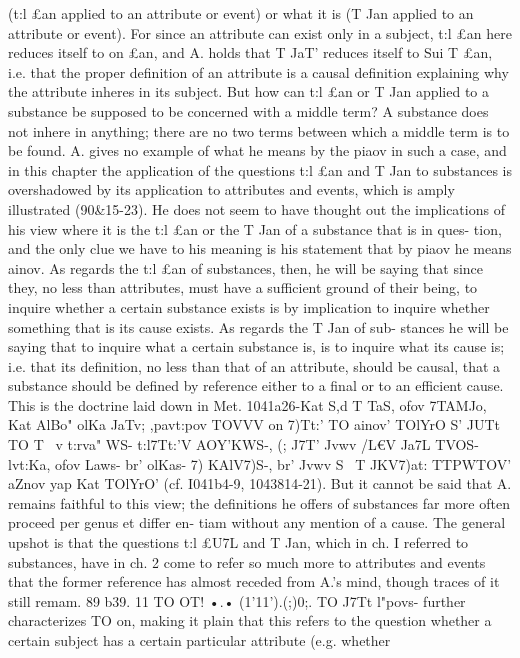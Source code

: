 (t:l £an applied to an attribute or event) or what it is (T{ Jan
applied to an attribute or event). For since an attribute can
exist only in a subject, t:l £an here reduces itself to on £an,
and A. holds that T{ JaT' reduces itself to Sui T{ £an, i.e. that the
proper definition of an attribute is a causal definition explaining
why the attribute inheres in its subject. But how can t:l £an or
T{ Jan applied to a substance be supposed to be concerned with
a middle term? A substance does not inhere in anything; there
are no two terms between which a middle term is to be found.
A. gives no example of what he means by the piaov in such a
case, and in this chapter the application of the questions t:l £an
and T{ Jan to substances is overshadowed by its application to
attributes and events, which is amply illustrated (90&15-23). He
does not seem to have thought out the implications of his view
where it is the t:l £an or the T{ Jan of a substance that is in ques-
tion, and the only clue we have to his meaning is his statement
that by piaov he means ainov. As regards the t:l £an of substances,
then, he will be saying that since they, no less than attributes,
must have a sufficient ground of their being, to inquire whether
a certain substance exists is by implication to inquire whether
something that is its cause exists. As regards the T{ Jan of sub-
stances he will be saying that to inquire what a certain substance
is, is to inquire what its cause is; i.e. that its definition, no less
than that of an attribute, should be causal, that a substance
should be defined by reference either to a final or to an efficient
cause. This is the doctrine laid down in Met. 1041a26-Kat S,d
T{ TaS{, ofov 7TAMJo, Kat AlBo" olK{a JaT{v; ,pavt:pov TO{VVV on {7)Tt:' TO
ainov' TOlYrO S' JUTt TO T{ ~v t:rva" WS- t:l7Tt:'V AOY'KWS-, (; J7T' Jv{wv /L€V
Ja7L T{VOS- lvt:Ka, ofov Laws- br' olK{as- 7) KAlV7)S-, br' Jv{wv S~ T{ JK{V7)at:
TTPWTOV' aZnov yap Kat TOlYrO' (cf. I041b4-9, 1043814-21). But it
cannot be said that A. remains faithful to this view; the definitions
he offers of substances far more often proceed per genus et differ en-
tiam without any mention of a cause.
The general upshot is that the questions t:l £U7L and T{ Jan,
which in ch. I referred to substances, have in ch. 2 come to refer
so much more to attributes and events that the former reference
has almost receded from A.'s mind, though traces of it still
remam.
89 b39. 11 TO OT! •.• (1'11').(;)0;. TO J7Tt l"povs- further characterizes
TO on, making it plain that this refers to the question whether
a certain subject has a certain particular attribute (e.g. whether
}}}}}}}}}}}}}}}}}}}}}
